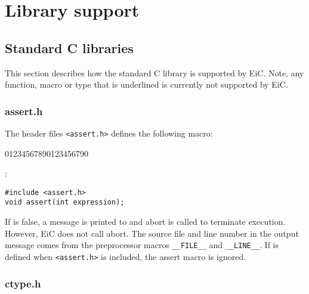 \chapter{Library support}
\label{chp:Library}

\section{Standard C libraries}
\label{sec:StandardCLibtraries}

This section describes how the standard C library is supported by
EiC. Note, any function, macro or type that is underlined is currently not 
supported by EiC. 



\subsection{assert.h}
\label{sec:assert}

The header files \verb+<assert.h>+ defines the following macro:

\begin{Ventry2}{01234567890123456790}

\item[assert]
:

\begin{production}
\begin{verbatim}
#include <assert.h>
void assert(int expression);
\end{verbatim}
\end{production}

     If  is false, a message is printed 
     to  and abort is called to terminate execution.  However, EiC does not call
	abort. The source file and line
     number in the output message comes from the preprocessor macros \verb+__FILE__+ and 
	\verb+__LINE__+. 
	If  is defined when \verb+<assert.h>+ is included, the assert macro is ignored.

\end{Ventry2}

\subsection{ctype.h}
\label{sec:ctype}


